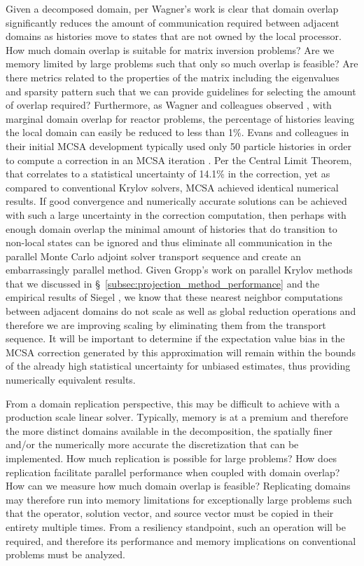 Given a decomposed domain, per Wagner's work
\citep{wagner_hybrid_2010} is clear that domain overlap significantly
reduces the amount of communication required between adjacent domains
as histories move to states that are not owned by the local
processor. How much domain overlap is suitable for matrix inversion
problems? Are we memory limited by large problems such that only so
much overlap is feasible? Are there metrics related to the properties
of the matrix including the eigenvalues and sparsity pattern such that
we can provide guidelines for selecting the amount of overlap
required? Furthermore, as Wagner and colleagues observed
\citep{wagner_hybrid_2010}, with marginal domain overlap for reactor
problems, the percentage of histories leaving the local domain can
easily be reduced to less than 1\%. Evans and colleagues in their
initial MCSA development typically used only 50 particle histories in
order to compute a correction in an MCSA iteration
\citep{evans_monte_2012}. Per the Central Limit Theorem, that
correlates to a statistical uncertainty of 14.1\% in the correction,
yet as compared to conventional Krylov solvers, MCSA achieved
identical numerical results. If good convergence and numerically
accurate solutions can be achieved with such a large uncertainty in
the correction computation, then perhaps with enough domain overlap
the minimal amount of histories that do transition to non-local states
can be ignored and thus eliminate all communication in the parallel
Monte Carlo adjoint solver transport sequence and create an
embarrassingly parallel method. Given Gropp's work on parallel Krylov
methods that we discussed in
\S~\ref{subsec:projection_method_performance} and the empirical
results of Siegel \citep{siegel_analysis_2012}, we know that these
nearest neighbor computations between adjacent domains do not scale as
well as global reduction operations and therefore we are improving
scaling by eliminating them from the transport sequence. It will be
important to determine if the expectation value bias in the MCSA
correction generated by this approximation will remain within the
bounds of the already high statistical uncertainty for unbiased
estimates, thus providing numerically equivalent results.

From a domain replication perspective, this may be difficult to
achieve with a production scale linear solver. Typically, memory is at
a premium and therefore the more distinct domains available in the
decomposition, the spatially finer and/or the numerically more
accurate the discretization that can be implemented. How much
replication is possible for large problems? How does replication
facilitate parallel performance when coupled with domain overlap? How
can we measure how much domain overlap is feasible? Replicating
domains may therefore run into memory limitations for exceptionally
large problems such that the operator, solution vector, and source
vector must be copied in their entirety multiple times. From a
resiliency standpoint, such an operation will be required, and
therefore its performance and memory implications on conventional
problems must be analyzed.

